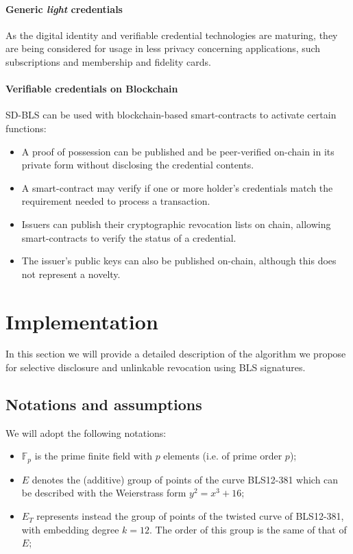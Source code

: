 \paragraph{Generic \textit{light} credentials}
As the digital identity and verifiable credential technologies are
maturing, they are being considered for usage in less privacy
concerning applications, such subscriptions and membership and
fidelity cards.

\paragraph{Verifiable credentials on Blockchain}
SD-BLS can be used with blockchain-based smart-contracts to activate
certain functions:
\begin{itemize}
    \item A proof of possession can be published and be peer-verified
      on-chain in its private form without disclosing the credential
      contents.
    \item A smart-contract may verify if one or more holder's
      credentials match the requirement needed to process a
      transaction.
    \item Issuers can publish their cryptographic revocation lists on
      chain, allowing smart-contracts to verify the status of a
      credential.
    \item The issuer's public keys can also be published on-chain,
      although this does not represent a novelty.
\end{itemize}

\section{Implementation}

In this section we will provide a detailed description of the
algorithm we propose for selective disclosure and unlinkable
revocation using BLS signatures.

\subsection{Notations and assumptions}

We will adopt the following notations:
\begin{itemize}

\item $\mathbb{F}_p$ is the prime finite field with $p$ elements
  (i.e. of prime order $p$);

\item $E$ denotes the (additive) group of points of the curve
  BLS12-381 \cite{bls381-12} which can be described with the
  Weierstrass form $y^2=x^3 + 16$;

\item $E_T$ represents instead the group of points of the twisted
  curve of BLS12-381, with embedding degree $k=12$. The order of
  this group is the same of that of $E$;

\end{itemize}

